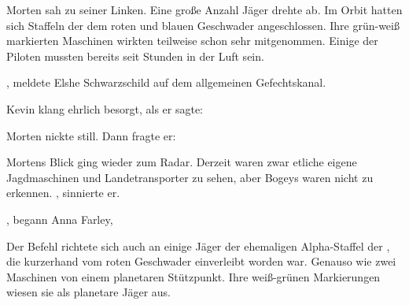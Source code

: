 Morten sah zu seiner Linken. Eine große Anzahl Jäger drehte ab. Im Orbit hatten sich Staffeln der  dem roten und blauen Geschwader angeschlossen. Ihre grün-weiß markierten Maschinen wirkten teilweise schon sehr mitgenommen. Einige der Piloten mussten bereits seit Stunden in der Luft sein.

\par

, meldete Elshe Schwarzschild auf dem allgemeinen Gefechtskanal. 

\par

Kevin klang ehrlich besorgt, als er sagte: 

\par

Morten nickte still. Dann fragte er: 

\par


\par


\par

Mortens Blick ging wieder zum Radar. Derzeit waren zwar etliche eigene Jagdmaschinen und Landetransporter zu sehen, aber Bogeys waren nicht zu erkennen. , sinnierte er. 

\par

, begann Anna Farley, 

\par

Der Befehl richtete sich auch an einige Jäger der ehemaligen Alpha-Staffel der , die kurzerhand vom roten Geschwader einverleibt worden war. Genauso wie zwei Maschinen von einem planetaren Stützpunkt. Ihre weiß-grünen Markierungen wiesen sie als planetare Jäger aus.

